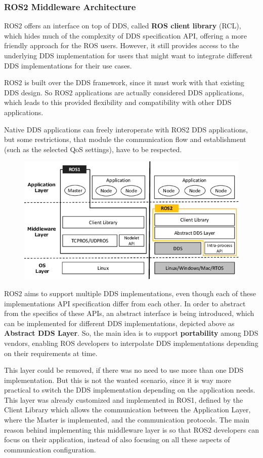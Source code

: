 \subsubsection{ROS2 Middleware Architecture}

ROS2 offers an interface on top of DDS, called \textbf{ROS client library} (RCL), which hides much of the complexity of DDS specification API, offering a more friendly approach for the ROS users. However, it still provides access to the underlying DDS implementation for users that might want to integrate different DDS implementations for their use cases.

ROS2 is built over the DDS framework, since it must work with that existing DDS design. So ROS2 applications are actually considered DDS applications, which leads to this provided flexibility and compatibility with other DDS applications.
                
Native DDS applications can freely interoperate with ROS2 DDS applications, but some restrictions, that module the communication flow and establishment (such as the selected QoS settings), have to be respected.
                
\begin{figure}[H]
    \centering
     \includegraphics[width=0.5\linewidth]{images/ROS2-architecture.png}
\end{figure}

ROS2 aims to support multiple DDS implementations, even though each of these implementations API specification differ from each other. In order to abstract from the specifics of these APIs, an abstract interface is being introduced, which can be implemented for different DDS implementations, depicted above as \textbf{Abstract DDS Layer}. So, the main idea is to support \textbf{portability} among DDS vendors, enabling ROS developers to interpolate DDS implementations depending on their requirements at time.

This layer could be removed, if there was no need to use more than one DDS implementation. But this is not the wanted scenario, since it is way more practical to switch the DDS implementation depending on the application needs. 
This layer was already customized and implemented in ROS1, defined by the Client Library which allows the communication between the Application Layer, where the Master is implemented, and the communication protocols. The main reason behind implementing this middleware layer is so that ROS2 developers can focus on their application, instead of also focusing on all these aspects of communication configuration. 

